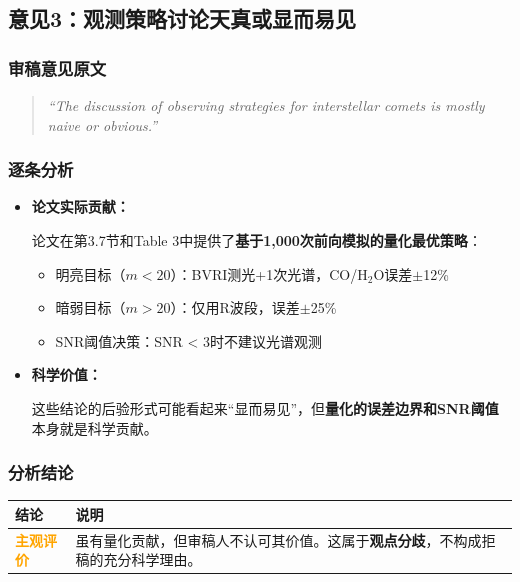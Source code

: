 \documentclass[12pt,a4paper]{article}
\begin{document}
\subsection{意见3：观测策略讨论天真或显而易见}

\subsubsection{审稿意见原文}
\begin{quote}
\textit{``The discussion of observing strategies for interstellar comets is mostly naive or obvious.''}
\end{quote}

\subsubsection{逐条分析}

\begin{itemize}[leftmargin=*]
    \item \textbf{论文实际贡献：}

    论文在第3.7节和Table 3中提供了\textbf{基于1,000次前向模拟的量化最优策略}：
    \begin{itemize}
        \item 明亮目标（$m < 20$）：BVRI测光+1次光谱，CO/H$_2$O误差$\pm$12\%
        \item 暗弱目标（$m > 20$）：仅用R波段，误差$\pm$25\%
        \item SNR阈值决策：SNR < 3时不建议光谱观测
    \end{itemize}

    \item \textbf{科学价值：}

    这些结论的后验形式可能看起来``显而易见''，但\textbf{量化的误差边界和SNR阈值}本身就是科学贡献。
\end{itemize}

\subsubsection{分析结论}
\begin{center}
\begin{tabular}{|p{3cm}|p{10cm}|}
\hline
\rowcolor{gray!20}
\textbf{结论} & \textbf{说明} \\
\hline
\textcolor{orange}{\textbf{主观评价}} & 虽有量化贡献，但审稿人不认可其价值。这属于\textbf{观点分歧}，不构成拒稿的充分科学理由。 \\
\hline
\end{tabular}
\end{center}
\end{document}

